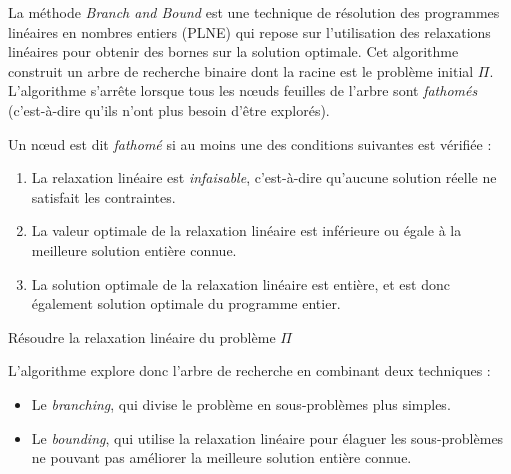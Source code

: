 La méthode \emph{Branch and Bound} est une technique de résolution des programmes linéaires en nombres entiers 
(PLNE) qui repose sur l'utilisation des relaxations linéaires pour obtenir des bornes sur la solution optimale.
Cet algorithme construit un arbre de recherche binaire dont la racine est le 
problème initial $\Pi$. L'algorithme s'arrête lorsque tous les nœuds feuilles de l'arbre sont \emph{fathomés} 
(c'est-à-dire qu'ils n'ont plus besoin d'être explorés).

\begin{definition}
    Un nœud est dit \emph{fathomé} si au moins une des conditions suivantes est vérifiée :
    \begin{enumerate}
        \item La relaxation linéaire est \emph{infaisable}, c'est-à-dire qu'aucune solution réelle ne satisfait les contraintes.
        \item La valeur optimale de la relaxation linéaire est inférieure ou égale à la meilleure solution entière connue.
        \item La solution optimale de la relaxation linéaire est entière, et est donc également solution optimale du programme entier.
    \end{enumerate}
\end{definition}

\begin{algorithm}[H]
    \DontPrintSemicolon
    \caption{Branch and Bound pour un programme linéaire en nombres entiers}\label{algo:branch_and_bound}

    Résoudre la relaxation linéaire du problème $\Pi$\;
\end{algorithm}

\begin{remark}
    L'algorithme explore donc l'arbre de recherche en combinant deux techniques :
    \begin{itemize}
        \item Le \emph{branching}, qui divise le problème en sous-problèmes plus simples.
        \item Le \emph{bounding}, qui utilise la relaxation linéaire pour élaguer les sous-problèmes 
              ne pouvant pas améliorer la meilleure solution entière connue.
    \end{itemize}
\end{remark}
